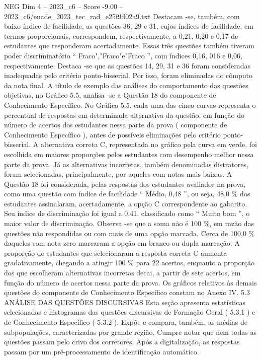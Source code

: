 \begin{textsample}{NEG Dim 4 – 2023\_c6 – Score -9.00 – 2023\_c6/enade\_2023\_tec\_rad\_e25f9d02a9.txt}
Destacam -se, também, com baixo índice de facilidade, as questões 36, 29 e 31, cujos índices de facilidade, em termos proporcionais, correspondem, respectivamente, a 0,21, 0,20 e 0,17 de estudantes que responderam acertadamente.
Essas três questões também tiveram poder discriminatório “ Fraco","Fraco"e"Fraco ”, com índices 0,16, 016 e 0,06, respectivamente.
Destaca -se que as questões 14, 29, 31 e 36 foram consideradas inadequadas pelo critério ponto-bisserial.
Por isso, foram eliminadas do cômputo da nota final.
A título de exemplo das análises do comportamento das questões objetivas, no Gráfico 5.5, analisa -se a Questão 18 do componente de Conhecimento Específico.
No Gráfico 5.5, cada uma das cinco curvas representa o percentual de respostas em determinada alternativa da questão, em função do número de acertos dos estudantes nessa parte da prova ( componente de Conhecimento Específico ), antes de possíveis eliminações pelo critério ponto-bisserial.
A alternativa correta C, representada no gráfico pela curva em verde, foi escolhida em maiores proporções pelos estudantes com desempenho melhor nessa parte da prova.
Já as alternativas incorretas, também denominadas distratores, foram selecionadas, principalmente, por aqueles com notas mais baixas.
A Questão 18 foi considerada, pelas respostas dos estudantes avaliados na prova, como uma questão com índice de facilidade “ Médio, 0,48 ”, ou seja, 48,0 \% dos estudantes assinalaram, acertadamente, a opção C correspondente ao gabarito.
Seu índice de discriminação foi igual a 0,41, classificado como “ Muito bom ”, o maior valor de discriminação.
Observa -se que a soma não é 100 \%, em razão das questões não respondidas ou com mais de uma opção marcada.
Cerca de 100,0 \% daqueles com nota zero marcaram a opção em branco ou dupla marcação.
A proporção de estudantes que selecionaram a resposta correta C aumenta gradativamente, chegando a atingir 100 \% para 22 acertos, enquanto a proporção dos que escolheram alternativas incorretas decai, a partir de sete acertos, em função do número de acertos nessa parte da prova.
Os gráficos relativos às demais questões do componente de Conhecimento Específico constam no Anexo IV. 5.3 ANÁLISE DAS QUESTÕES DISCURSIVAS Esta seção apresenta estatísticas selecionadas e histogramas das questões discursivas de Formação Geral ( 5.3.1 ) e de Conhecimento Específico ( 5.3.2 ).
Expõe e compara, também, as médias de subpopulações, caracterizadas por grande região.
Cumpre notar que nem todas as questões passam pelo crivo dos corretores.
Após a digitalização, as respostas passam por um pré-processamento de identificação automático.

\end{textsample}
